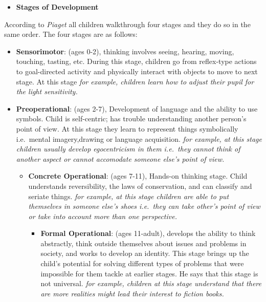 \documentclass[11pt]{article}
\providecommand{\tightlist}{%
      \setlength{\itemsep}{0pt}\setlength{\parskip}{0pt}}
\begin{document}
\begin{itemize}
\tightlist
\item
  \textbf{Stages of Development}
\end{itemize}

According to \emph{Piaget} all children walkthrough four stages and they
do so in the same order. The four stages are as follows:

\begin{itemize}
\tightlist
\item
  \textbf{Sensorimotor}: (ages 0-2), thinking involves seeing, hearing,
  moving, touching, tasting, etc. During this stage, children go from
  reflex-type actions to goal-directed activity and physically interact
  with objects to move to next stage. At this stage \emph{for example,
  children learn how to adjust their pupil for the light sensitivity.}
\item
  \textbf{Preoperational}: (ages 2-7), Development of language and the
  ability to use symbols. Child is self-centric; has trouble
  understanding another person's point of view. At this stage they learn
  to represent things symbolically i.e.~mental imagery,drawing or
  language acquisition. \emph{for example, at this stage children
  usually develop egocentricism in them i.e.~they cannot think of
  another aspect or cannot accomodate someone else's point of view.}

  \begin{itemize}
  \tightlist
  \item
    \textbf{Concrete Operational}: (ages 7-11), Hands-on thinking stage.
    Child understands reversibility, the laws of conservation, and can
    classify and seriate things. \emph{for example, at this stage
    children are able to put themselves in someone else's shoes
    i.e.~they can take other's point of view or take into account more
    than one perspective.}

    \begin{itemize}
    \tightlist
    \item
      \textbf{Formal Operational}: (ages 11-adult), develops the ability
      to think abstractly, think outside themselves about issues and
      problems in society, and works to develop an identity. This stage
      brings up the child's potential for solving different types of
      problems that were impossible for them tackle at earlier stages.
      He says that this stage is not universal. \emph{for example,
      children at this stage understand that there are more realities
      might lead their interest to fiction books.}
    \end{itemize}
  \end{itemize}
\end{itemize}
\end{document}
